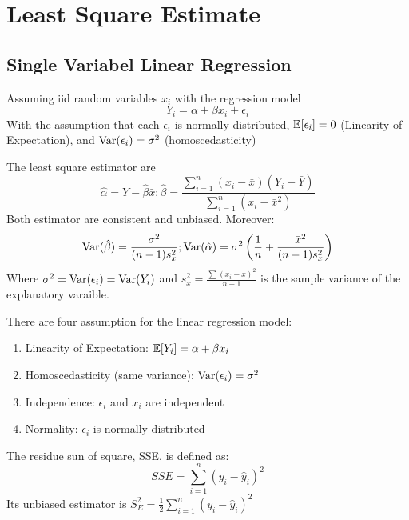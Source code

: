 \section{Least Square Estimate}

\subsection{Single Variabel Linear Regression}
\begin{theorem}
	Assuming iid random variables $x_i$ with the regression model
	\begin{equation}
		Y_i=\alpha + \beta	x_i + \epsilon_i
	\end{equation}
	With the assumption that each $\epsilon_i$ is normally distributed, $\mathbb{E}[\epsilon_i]=0$ (Linearity of Expectation), and $\text{Var}( \epsilon_i )=\sigma^2$ (homoscedasticity) 

	The least square estimator are 
	\begin{equation}
		\hat{\alpha} = \bar{Y}-\hat{\beta}\bar{x}; \hat{\beta} = \frac{\sum^{n}_{i=1}(x_i-\bar{x})(Y_i-\bar{Y}) }{\sum^{n}_{i=1}(x_i-\bar{x}^2) }
	\end{equation}
	Both estimator are consistent and unbiased. Moreover:
	\begin{equation}
		\text{Var}(\hat{\beta}) = \frac{\sigma^2}{(n-1)s^2_x}; \text{Var}(\hat{ \alpha })=\sigma^2\left(\frac{1}{n}+\frac{\bar{x}^2}{(n-1)s^2_x}\right)
	\end{equation}
	Where $\sigma^2=\text{Var}(\epsilon_i)=\text{Var}(Y_i)$ and $s_x^2= \frac{\sum (x_i-x)^2 }{n-1}$ is the sample variance of the explanatory varaible.
\end{theorem}

\begin{remark}
	There are four assumption for the linear regression model:
	\begin{enumerate}
		\item Linearity of Expectation: $\mathbb{E}[Y_i]=\alpha + \beta x_i$
		\item Homoscedasticity (same variance): $\text{Var}( \epsilon_i )=\sigma^2$
		\item Independence: $\epsilon_i$ and $x_i$ are independent
		\item Normality: $\epsilon_i$ is normally distributed
	\end{enumerate}
\end{remark}
\begin{definition}
	The residue sun of square, SSE, is defined as:
	\begin{equation}
		SSE=\sum^{n}_{i=1}(y_i-\hat{y}_i)^2
	\end{equation}
	Its unbiased estimator is $S^2_E = \frac{1}{2}\sum^{n}_{i=1}(y_i-\hat{y}_i)^2$
\end{definition}

